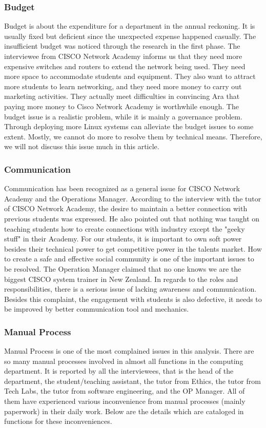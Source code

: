 \subsubsection{Budget}
Budget is about the expenditure for a department in the annual reckoning. It is usually fixed but deficient since the unexpected expense happened casually. The insufficient budget was noticed through the research in the first phase. The interviewee from CISCO Network Academy informs us that they need more expensive switches and routers to extend the network being used. They need more space to accommodate students and equipment. They also want to attract more students to learn networking, and they need more money to carry out marketing activities. They actually meet difficulties in convincing Ara that paying more money to Cisco Network Academy is worthwhile enough. The budget issue is a realistic problem, while it is mainly a governance problem. Through deploying more Linux systems can alleviate the budget issues to some extent. Mostly, we cannot do more to resolve them by technical means. Therefore, we will not discuss this issue much in this article.

\subsubsection{Communication}
Communication has been recognized as a general issue for CISCO Network Academy and the Operations Manager. According to the interview with the tutor of CISCO Network Academy, the desire to maintain a better connection with previous students was expressed. He also pointed out that nothing was taught on teaching students how to create connections with industry except the "geeky stuff" in their Academy. For our students, it is important to own soft power besides their technical power to get competitive power in the talents market. How to create a safe and effective social community is one of the important issues to be resolved. The Operation Manager claimed that no one knows we are the biggest CISCO system trainer in New Zealand. In regards to the roles and responsibilities, there is a serious issue of lacking awareness and communication. Besides this complaint, the engagement with students is also defective, it needs to be improved by better communication tool and mechanics.

\subsubsection{Manual Process}
Manual Process is one of the most complained issues in this analysis. There are so many manual processes involved in almost all functions in the computing department. It is reported by all the interviewees, that is the head of the department, the student/teaching assistant, the tutor from Ethics, the tutor from Tech Labs, the tutor from software engineering, and the OP Manager. All of them have experienced various inconvenience from manual processes (mainly paperwork) in their daily work. Below are the details which are cataloged in functions for these inconveniences.

